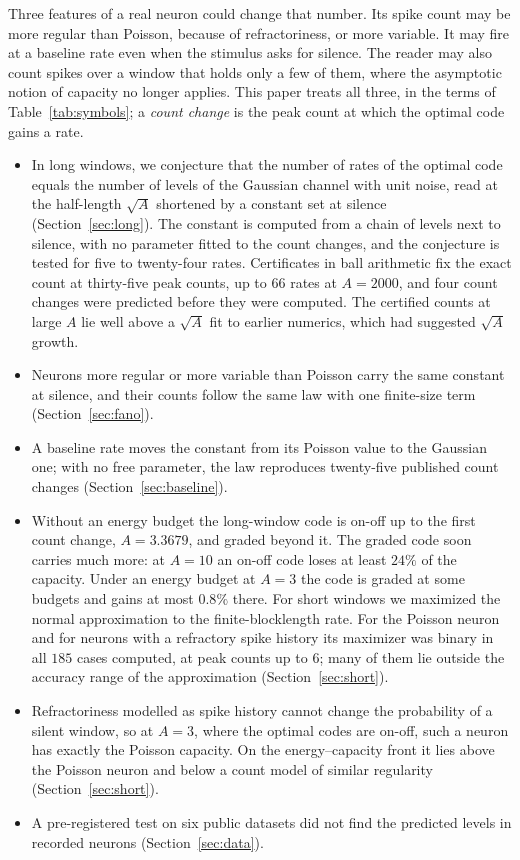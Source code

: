 \documentclass[journal]{IEEEtran}
\begin{document}
Three features of a real neuron could change that number. Its spike count may be more regular than Poisson, because of
refractoriness, or more variable. It may fire at a baseline rate even when the stimulus asks for silence. The reader may also count
spikes over a window that holds only a few of them, where the asymptotic notion of capacity no longer applies. This paper treats all
three, in the terms of Table~\ref{tab:symbols}; a \emph{count change} is the peak count at which the optimal code gains a rate.
\begin{itemize}
\item In long windows, we conjecture that the number of rates of the optimal code equals the number of levels of the Gaussian
channel with unit noise, read at the half-length $\sqrt A$ shortened by a constant set at silence (Section~\ref{sec:long}). The
constant is computed from a chain of levels next to silence, with no parameter fitted to the count changes, and the conjecture is
tested for five to twenty-four rates. Certificates in ball arithmetic fix the exact count at thirty-five peak counts, up to $66$ rates
at $A = 2000$, and four count changes were predicted before they were computed. The certified counts at large $A$ lie well above a
$\sqrt A$ fit to earlier numerics, which had suggested $\sqrt A$ growth.
\item Neurons more regular or more variable than Poisson carry the same constant at silence, and their counts follow the same law
with one finite-size term (Section~\ref{sec:fano}).
\item A baseline rate moves the constant from its Poisson value to the Gaussian one; with no free parameter, the law reproduces
twenty-five published count changes (Section~\ref{sec:baseline}).
\item Without an energy budget the long-window code is on-off up to the first count change, $A = 3.3679$, and graded beyond it.
The graded code soon carries much more: at $A = 10$ an on-off code loses at least $24\%$ of the capacity. Under an energy budget
at $A = 3$ the code is graded at some budgets and gains at most $0.8\%$ there. For short windows we maximized the normal
approximation to the finite-blocklength rate. For the Poisson neuron and for neurons with a refractory spike history its maximizer was
binary in all $185$ cases computed, at peak counts up to $6$; many of them lie outside the accuracy range of the approximation
(Section~\ref{sec:short}).
\item Refractoriness modelled as spike history cannot change the probability of a silent window, so at $A = 3$, where the optimal
codes are on-off, such a neuron has exactly the Poisson capacity. On the energy--capacity front it lies above the Poisson neuron and
below a count model of similar regularity (Section~\ref{sec:short}).
\item A pre-registered test on six public datasets did not find the predicted levels in recorded neurons (Section~\ref{sec:data}).
\end{itemize}
\end{document}
